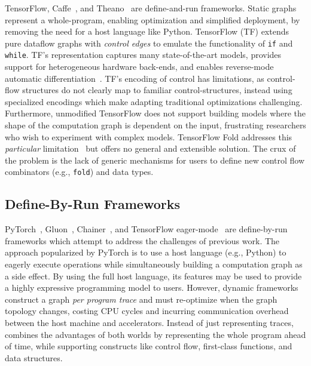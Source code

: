 TensorFlow, Caffe~\cite{caffe}, and Theano~\cite{theano} are define-and-run frameworks.
Static graphs represent a whole-program,
  enabling optimization and simplified deployment,
  by removing the need for a host language like Python.
TensorFlow (TF) extends pure dataflow graphs with \textit{control edges}
      to emulate the functionality of \verb|if| and \verb|while|.
TF's representation captures many state-of-the-art models,
      provides support for heterogeneous hardware back-ends,
      and enables reverse-mode automatic differentiation~{\cite{ad_survey, tensorflow}}.
TF's encoding of control has limitations, as control-flow structures
    do not clearly map to familiar control-structures, instead using specialized
    encodings which make adapting traditional optimizations challenging.
Furthermore,
    unmodified TensorFlow does not support building models where the shape of
    the computation graph is dependent on the input,
    frustrating researchers who wish to experiment with complex models.
TensorFlow Fold addresses this \textit{particular} limitation~\cite{tensorflowfold}
    but offers no general and extensible solution.
The crux of the problem is the lack of generic mechanisms for users to
    define new control flow combinators (e.g., \verb|fold|) and data types.

\subsection*{Define-By-Run Frameworks}
PyTorch~\cite{pytorch_ad}, Gluon~\cite{gluon}, Chainer~\cite{chainer_learningsys2015},
    and TensorFlow eager-mode~\cite{tf_eager} are define-by-run frameworks which
    attempt to address the challenges of previous work.
The approach popularized by PyTorch is to use a host language (e.g., Python)
    to eagerly execute operations while simultaneously building a computation graph
    as a side effect.
By using the full host language,
  its features may be used to provide a highly expressive programming model to users.
However, dynamic frameworks construct a graph \textit{per program trace} and must re-optimize when
    the graph topology changes, costing CPU cycles and incurring communication overhead between the host
    machine and accelerators.
Instead of just representing traces, \relay combines the advantages of both worlds by
    representing the whole program ahead of time,
    while supporting constructs like control flow, first-class functions, and data structures.

